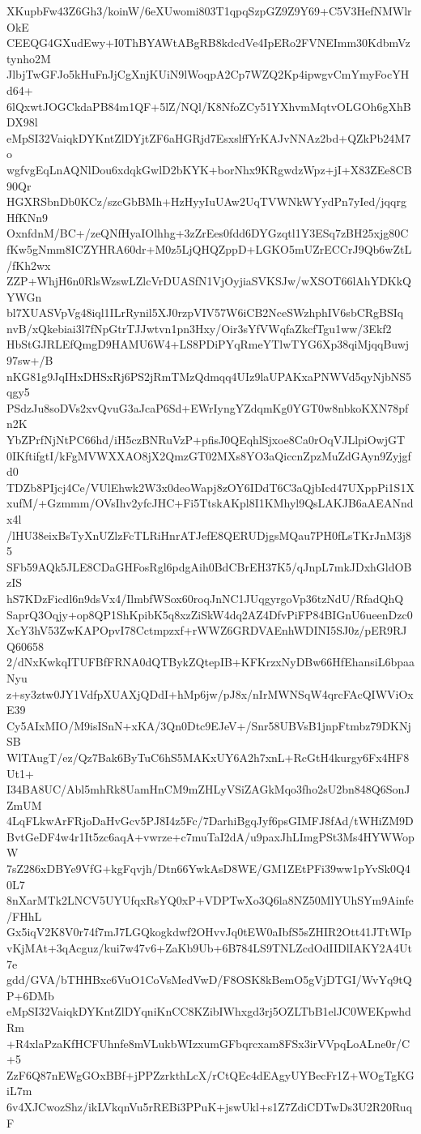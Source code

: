 XKupbFw43Z6Gh3/koinW/6eXUwomi803T1qpqSzpGZ9Z9Y69+C5V3HefNMWlrOkE
CEEQG4GXudEwy+I0ThBYAWtABgRB8kdcdVe4IpERo2FVNEImm30KdbmVztynho2M
JlbjTwGFJo5kHuFnJjCgXnjKUiN9lWoqpA2Cp7WZQ2Kp4ipwgvCmYmyFocYHd64+
6lQxwtJOGCkdaPB84m1QF+5lZ/NQl/K8NfoZCy51YXhvmMqtvOLGOh6gXhBDX98l
eMpSI32VaiqkDYKntZlDYjtZF6aHGRjd7EsxslffYrKAJvNNAz2bd+QZkPb24M7o
wgfvgEqLnAQNlDou6xdqkGwlD2bKYK+borNhx9KRgwdzWpz+jI+X83ZEe8CB90Qr
HGXRSbnDb0KCz/szcGbBMh+HzHyyIuUAw2UqTVWNkWYydPn7yIed/jqqrgHfKNn9
OxnfdnM/BC+/zeQNfHyaIOlhhg+3zZrEes0fdd6DYGzqtl1Y3ESq7zBH25xjg80C
fKw5gNmm8ICZYHRA60dr+M0z5LjQHQZppD+LGKO5mUZrECCrJ9Qb6wZtL/fKh2wx
ZZP+WhjH6n0RlsWzswLZlcVrDUASfN1VjOyjiaSVKSJw/wXSOT66lAhYDKkQYWGn
bl7XUASVpVg48iql1ILrRynil5XJ0rzpVIV57W6iCB2NceSWzhphIV6sbCRgBSIq
nvB/xQkebiai3l7fNpGtrTJJwtvn1pn3Hxy/Oir3sYfVWqfaZkcfTgu1ww/3Ekf2
HbStGJRLEfQmgD9HAMU6W4+LS8PDiPYqRmeYTlwTYG6Xp38qiMjqqBuwj97sw+/B
nKG81g9JqIHxDHSxRj6PS2jRmTMzQdmqq4UIz9laUPAKxaPNWVd5qyNjbNS5qgy5
PSdzJu8soDVs2xvQvuG3aJcaP6Sd+EWrIyngYZdqmKg0YGT0w8nbkoKXN78pfn2K
YbZPrfNjNtPC66hd/iH5czBNRuVzP+pfisJ0QEqhlSjxoe8Ca0rOqVJLlpiOwjGT
0IKftifgtI/kFgMVWXXAO8jX2QmzGT02MXs8YO3aQiccnZpzMuZdGAyn9Zyjgfd0
TDZb8PIjcj4Ce/VUlEhwk2W3x0deoWapj8zOY6IDdT6C3aQjbIcd47UXppPi1S1X
xufM/+Gzmmm/OVsIhv2yfcJHC+Fi5TtskAKpl8I1KMhyl9QsLAKJB6aAEANndx4l
/lHU38eixBsTyXnUZlzFcTLRiHnrATJefE8QERUDjgsMQau7PH0fLsTKrJnM3j85
SFb59AQk5JLE8CDaGHFosRgl6pdgAih0BdCBrEH37K5/qJnpL7mkJDxhGldOBzIS
hS7KDzFicdl6n9dsVx4/IlmbfWSox60roqJnNC1JUqgyrgoVp36tzNdU/RfadQhQ
SaprQ3Oqjy+op8QP1ShKpibK5q8xzZiSkW4dq2AZ4DfvPiFP84BIGnU6ueenDzc0
XcY3hV53ZwKAPOpvI78Cctmpzxf+rWWZ6GRDVAEnhWDINI5SJ0z/pER9RJQ60658
2/dNxKwkqITUFBfFRNA0dQTBykZQtepIB+KFKrzxNyDBw66HfEhansiL6bpaaNyu
z+sy3ztw0JY1VdfpXUAXjQDdI+hMp6jw/pJ8x/nIrMWNSqW4qrcFAcQIWViOxE39
Cy5AIxMIO/M9isISnN+xKA/3Qn0Dtc9EJeV+/Snr58UBVsB1jnpFtmbz79DKNjSB
WlTAugT/ez/Qz7Bak6ByTuC6hS5MAKxUY6A2h7xnL+RcGtH4kurgy6Fx4HF8Ut1+
I34BA8UC/Abl5mhRk8UamHnCM9mZHLyVSiZAGkMqo3fho2sU2bn848Q6SonJZmUM
4LqFLkwArFRjoDaHvGcv5PJ8I4z5Fc/7DarhiBgqJyf6psGIMFJ8fAd/tWHiZM9D
BvtGeDF4w4r1It5zc6aqA+vwrze+c7muTaI2dA/u9paxJhLImgPSt3Ms4HYWWopW
7sZ286xDBYe9VfG+kgFqvjh/Dtn66YwkAsD8WE/GM1ZEtPFi39ww1pYvSk0Q40L7
8nXarMTk2LNCV5UYUfqxRsYQ0xP+VDPTwXo3Q6la8NZ50MlYUhSYm9Ainfe/FHhL
Gx5iqV2K8V0r74f7mJ7LGQkogkdwf2OHvvJq0tEW0aIbfS5sZHIR2Ott41JTtWIp
vKjMAt+3qAcguz/kui7w47v6+ZaKb9Ub+6B784LS9TNLZcdOdIIDlIAKY2A4Ut7e
gdd/GVA/bTHHBxc6VuO1CoVsMedVwD/F8OSK8kBemO5gVjDTGI/WvYq9tQP+6DMb
eMpSI32VaiqkDYKntZlDYqniKnCC8KZibIWhxgd3rj5OZLTbB1elJC0WEKpwhdRm
+R4xlaPzaKfHCFUhnfe8mVLukbWIzxumGFbqrcxam8FSx3irVVpqLoALne0r/C+5
ZzF6Q87nEWgGOxBBf+jPPZzrkthLcX/rCtQEc4dEAgyUYBecFr1Z+WOgTgKGiL7m
6v4XJCwozShz/ikLVkqnVu5rREBi3PPuK+jswUkl+s1Z7ZdiCDTwDs3U2R20RuqF
